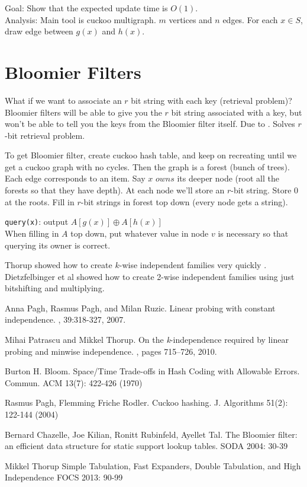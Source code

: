 \documentclass[11pt]{article}
\theoremstyle{definition}
\begin{document}
Goal: Show that the expected update time is $O(1)$.\\
Analysis: Main tool is cuckoo multigraph. $m$ vertices and $n$ edges. For each $x \in S$, draw edge between $g(x)$ and $h(x)$.

\section{Bloomier Filters}
What if we want to associate an $r$ bit string with each key (retrieval problem)? Bloomier filters will be able to give you the $r$ bit string associated with a key, but won't be able to tell you the keys from the Bloomier filter itself. Due to \cite{ckrt}. Solves $r$-bit retrieval problem.

To get Bloomier filter, create cuckoo hash table, and keep on recreating until we get a cuckoo graph with no cycles. Then the graph is a forest (bunch of trees). Each edge corresponds to an item. Say $x$ $owns$ its deeper node (root all the forests so that they have depth). At each node we'll store an $r$-bit string. Store 0 at the roots. Fill in $r$-bit strings in forest top down (every node gets a string).

\texttt{query(x)}: output $A[g(x)] \oplus A[h(x)]$\\
When filling in $A$ top down, put whatever value in node $v$ is necessary so that querying its owner is correct.

Thorup showed how to create $k$-wise independent families very quickly \cite{t13}.
Dietzfelbinger et al showed how to create 2-wise independent families using just bitshifting and multiplying.


\begin{thebibliography}{}

Anna Pagh, Rasmus Pagh, and Milan Ruzic.
\newblock Linear probing with constant independence.
, 39:318-327, 2007.

Mihai Patrascu and Mikkel Thorup.
\newblock On the \emph{k}-independence required by linear probing and minwise
  independence.
, pages 715--726, 2010.

Burton H. Bloom.
\newblock Space/Time Trade-offs in Hash Coding with Allowable Errors.
\newblock Commun. ACM 13(7): 422-426 (1970)

Rasmus Pagh, Flemming Friche Rodler.
\newblock Cuckoo hashing.
\newblock J. Algorithms 51(2): 122-144 (2004)

Bernard Chazelle, Joe Kilian, Ronitt Rubinfeld, Ayellet Tal.
\newblock The Bloomier filter: an efficient data structure for static support lookup tables.
\newblock SODA 2004: 30-39

Mikkel Thorup
\newblock Simple Tabulation, Fast Expanders, Double Tabulation, and High Independence
\newblock FOCS 2013: 90-99

\end{thebibliography}
\end{document}
